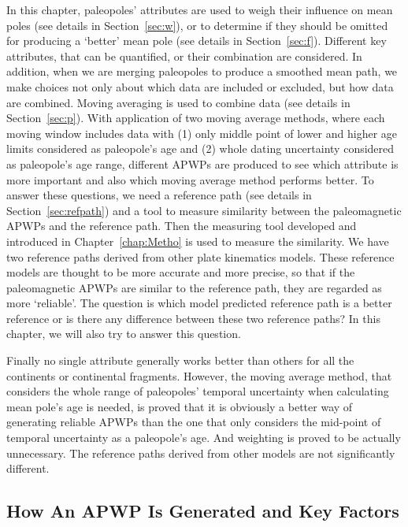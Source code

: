 In this chapter, paleopoles' attributes are used to weigh their influence on
mean poles (see details in Section~\ref{sec:w}), or to determine if they should
be omitted for producing a `better' mean pole (see details in
Section~\ref{sec:f}). Different key attributes, that can be quantified, or their
combination are considered. In addition, when we are merging paleopoles to
produce a smoothed mean path, we make choices not only about which data are
included or excluded, but how data are combined. Moving averaging is used to
combine data (see details in Section~\ref{sec:p}). With application of two
moving average methods, where each moving window includes data with (1) only
middle point of lower and higher age limits considered as paleopole's age and
(2) whole dating uncertainty considered as paleopole's age range, different
APWPs are produced to see which attribute is more important and also which
moving average method performs better. To answer these questions, we need a
reference path (see details in Section~\ref{sec:refpath}) and a tool to measure
similarity between the paleomagnetic APWPs and the reference path. Then the
measuring tool developed and introduced in Chapter~\ref{chap:Metho} is used to
measure the similarity. We have two reference paths derived from other plate
kinematics models. These reference models are thought to be more accurate and
more precise, so that if the paleomagnetic APWPs are similar to the reference
path, they are regarded as more `reliable'. The question is which model
predicted reference path is a better reference or is there any difference
between these two reference paths? In this chapter, we will also try to answer
this question.

Finally no single attribute generally works better than others for all the
continents or continental fragments. However, the moving average method, that
considers the whole range of paleopoles' temporal uncertainty when calculating
mean pole's age is needed, is proved that it is obviously a better way of
generating reliable APWPs than the one that only considers the mid-point of
temporal uncertainty as a paleopole's age. And weighting is proved to be
actually unnecessary. The reference paths derived from other models are not
significantly different.

\subsection{How An APWP Is Generated and Key Factors}

